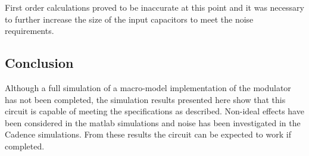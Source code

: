     First order calculations proved to be inaccurate at this point and it was necessary to further increase the size of the input capacitors to meet the noise requirements.


    

   
 


\subsection{Conclusion}
\label{Verification:conclusion}
Although a full simulation of a macro-model implementation of the modulator has not been completed, the simulation results presented here show that this circuit is capable of meeting the specifications as described.
Non-ideal effects have been considered in the matlab simulations and noise has been investigated in the Cadence simulations.
From these results the circuit can be expected to work if completed.

